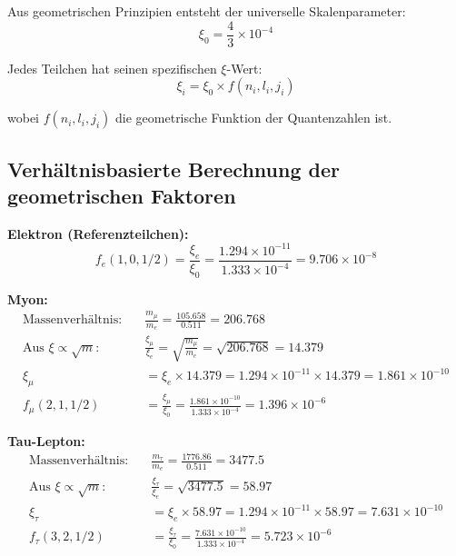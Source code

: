 \documentclass[12pt,a4paper]{article}
\begin{document}
	Aus geometrischen Prinzipien entsteht der universelle Skalenparameter:
	\begin{equation}
		\xi_0 = \frac{4}{3} \times 10^{-4}
	\end{equation}
	
	Jedes Teilchen hat seinen spezifischen $\xi$-Wert:
	\begin{equation}
		\xi_i = \xi_0 \times f(n_i, l_i, j_i)
	\end{equation}
	
	wobei $f(n_i, l_i, j_i)$ die geometrische Funktion der Quantenzahlen ist.
	
	\subsection{Verhältnisbasierte Berechnung der geometrischen Faktoren}
	
	\textbf{Elektron (Referenzteilchen):}
	\begin{equation}
		f_e(1,0,1/2) = \frac{\xi_e}{\xi_0} = \frac{1.294 \times 10^{-11}}{1.333 \times 10^{-4}} = 9.706 \times 10^{-8}
	\end{equation}
	
	\textbf{Myon:}
	\begin{align}
		\text{Massenverhältnis:} \quad &\frac{m_\mu}{m_e} = \frac{105.658}{0.511} = 206.768\\
		\text{Aus } \xi \propto \sqrt{m}: \quad &\frac{\xi_\mu}{\xi_e} = \sqrt{\frac{m_\mu}{m_e}} = \sqrt{206.768} = 14.379\\
		\xi_\mu &= \xi_e \times 14.379 = 1.294 \times 10^{-11} \times 14.379 = 1.861 \times 10^{-10}\\
		f_\mu(2,1,1/2) &= \frac{\xi_\mu}{\xi_0} = \frac{1.861 \times 10^{-10}}{1.333 \times 10^{-4}} = 1.396 \times 10^{-6}
	\end{align}
	
	\textbf{Tau-Lepton:}
	\begin{align}
		\text{Massenverhältnis:} \quad &\frac{m_\tau}{m_e} = \frac{1776.86}{0.511} = 3477.5\\
		\text{Aus } \xi \propto \sqrt{m}: \quad &\frac{\xi_\tau}{\xi_e} = \sqrt{3477.5} = 58.97\\
		\xi_\tau &= \xi_e \times 58.97 = 1.294 \times 10^{-11} \times 58.97 = 7.631 \times 10^{-10}\\
		f_\tau(3,2,1/2) &= \frac{\xi_\tau}{\xi_0} = \frac{7.631 \times 10^{-10}}{1.333 \times 10^{-4}} = 5.723 \times 10^{-6}
	\end{align}
	
\end{document}
